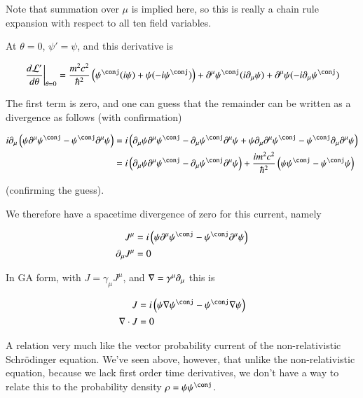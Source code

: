 \documentclass{article}
\begin{document}
Note that summation over $\mu$ is implied here, so this is really a chain rule expansion with respect to all ten field variables.

At $\theta=0$, $\psi' = \psi$, and this derivative is

\begin{align*}
{\left. \frac{d\LL'}{d\theta} \right\vert}_{\theta=0}
&=
\frac{m^2 c^2}{\hbar^2}\left( \psi^\conj (i \psi) + \psi (-i\psi^\conj) \right)
+ \partial^\mu \psi^\conj (i\partial_\mu \psi)
+ \partial^\mu \psi (-i \partial_\mu {\psi}^\conj) \\
\end{align*}

The first term is zero, and one can guess that the remainder can be written as a divergence as follows (with confirmation)

\begin{align*}
i \partial_\mu \left(
\psi \partial^\mu \psi^\conj
-\psi^\conj \partial^\mu \psi
\right)
&=
i \left(
\partial_\mu \psi \partial^\mu \psi^\conj
-\partial_\mu \psi^\conj \partial^\mu \psi
+\psi \partial_\mu \partial^\mu \psi^\conj
-\psi^\conj \partial_\mu \partial^\mu \psi
\right) \\
&=
i \left(
\partial_\mu \psi \partial^\mu \psi^\conj
-\partial_\mu \psi^\conj \partial^\mu \psi \right)
+ \frac{ i m^2 c^2}{\hbar^2} \left(
\psi \psi^\conj
-\psi^\conj \psi
\right) \\
\end{align*}

(confirming the guess).

We therefore have a spacetime divergence of zero for this current, namely

\begin{align}
J^\mu &=
i \left(
\psi \partial^\mu \psi^\conj
-\psi^\conj \partial^\mu \psi
\right) \\
\partial_\mu J^\mu &= 0
\end{align}

In GA form, with $J = \gamma_\mu J^\mu$, and $\nabla = \gamma^\mu \partial_\mu$ this is

\begin{align}
J &=
i \left(
\psi \grad \psi^\conj
-\psi^\conj \grad \psi
\right) \\
\grad \cdot J &= 0
\end{align}

A relation very much like the vector probability current of the non-relativistic Schr\"{o}dinger equation.  We've seen above, however, that
unlike the non-relativistic equation, because we lack first order time derivatives, we don't have a way to relate this to the probability density
$\rho = \psi\psi^\conj$.
\end{document}
